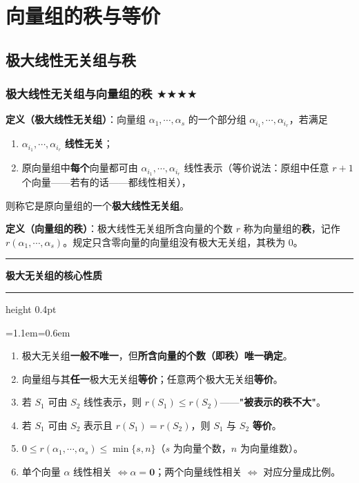 \documentclass[11pt,openany,UTF8]{ctexbook}
\newcommand{\callouthead}[2]{%
  \par\addvspace{7pt}\noindent
  {\color{#1}\rule[-0.15em]{3pt}{1.05em}}\hspace{0.5em}%
  {\bfseries\color{#1}#2}\par\nobreak\vspace{-0.35em}%
  {\color{rulesep}\hrule height 0.4pt}\nobreak\vspace{0.45em}%
  \begingroup\small\setlength{\parindent}{0pt}%
  \leftskip=1.1em\rightskip=0.6em\noindent\ignorespaces}
\newcommand{\calloutend}{\par\endgroup\addvspace{7pt}}
\newenvironment{callkey}[1]{\callouthead{keybar}{#1}}{\calloutend}
\begin{document}
\section{向量组的秩与等价}

\subsection{极大线性无关组与秩}

\subsubsection{极大线性无关组与向量组的秩 $\bigstar$$\bigstar$$\bigstar$$\bigstar$}

\textbf{定义（极大线性无关组）}：向量组 $\alpha_1,\cdots,\alpha_s$ 的一个部分组 $\alpha_{i_1},\cdots,\alpha_{i_r}$，若满足

\begin{enumerate}
\item $\alpha_{i_1},\cdots,\alpha_{i_r}$ \textbf{线性无关}；
\item 原向量组中\textbf{每个}向量都可由 $\alpha_{i_1},\cdots,\alpha_{i_r}$ 线性表示（等价说法：原组中任意 $r+1$ 个向量——若有的话——都线性相关），
\end{enumerate}
则称它是原向量组的一个\textbf{极大线性无关组}。

\textbf{定义（向量组的秩）}：极大线性无关组所含向量的个数 $r$ 称为向量组的\textbf{秩}，记作 $r(\alpha_1,\cdots,\alpha_s)$。规定只含零向量的向量组没有极大无关组，其秩为 $0$。

\begin{callkey}{极大无关组的核心性质}
\begin{enumerate}
\item 极大无关组\textbf{一般不唯一}，但\textbf{所含向量的个数（即秩）唯一确定}。
\item 向量组与其\textbf{任一}极大无关组\textbf{等价}；任意两个极大无关组\textbf{等价}。
\item 若 $S_1$ 可由 $S_2$ 线性表示，则 $r(S_1)\le r(S_2)$——\textbf{"被表示的秩不大"}。
\item 若 $S_1$ 可由 $S_2$ 表示且 $r(S_1)=r(S_2)$，则 $S_1$ 与 $S_2$ \textbf{等价}。
\item $0\le r(\alpha_1,\cdots,\alpha_s)\le\min\{s,n\}$（$s$ 为向量个数，$n$ 为向量维数）。
\item 单个向量 $\alpha$ 线性相关 $\iff\alpha=\mathbf{0}$；两个向量线性相关 $\iff$ 对应分量成比例。
\end{enumerate}
\end{callkey}
\end{document}
